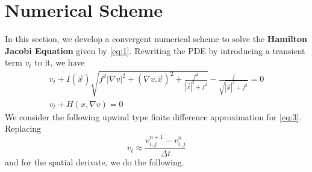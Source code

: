 \documentclass[11pt]{report}
\begin{document}
	 \section{Numerical Scheme}
	 In this section, we develop a convergent numerical scheme to solve the \textbf{Hamilton Jacobi Equation} given by \ref{eq:1}. Rewriting the PDE by introducing a transient term $v_t$ to it, we have
	 	\begin{gather}
		v_t + I(\vec{x})\sqrt{f^2|\nabla v|^2 + (\nabla v. \vec{x})^2 + \frac{f^2}{|\vec{x}|^2+f^2}} - \frac{f}{\sqrt{|\vec{x}|^2+f^2}} = 0 \\
		v_t + H(x,\nabla v) = 0\label{eq:3}
	 \end{gather}
	\noindent
	We consider the following upwind type finite difference approximation for \ref{eq:3}. Replacing 
	\begin{equation}
		v_t \approx \frac{v_{i,j}^{n+1} - v_{i,j}^n}{\Delta t}
	\end{equation}
	and for the spatial derivate, we do the following. 
	
\end{document}
